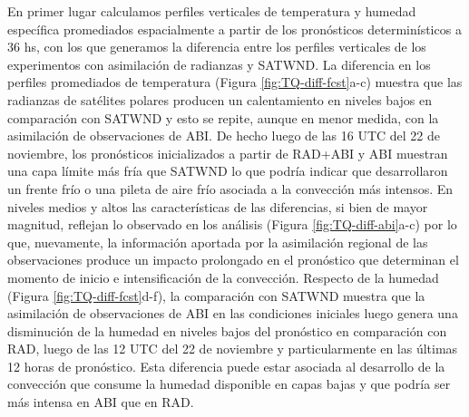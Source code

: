 \documentclass[12pt,oneside,a4paper]{reedthesis}
\begin{document}
En primer lugar calculamos perfiles verticales de temperatura y humedad específica promediados espacialmente a partir de los pronósticos determinísticos a 36 hs, con los que generamos la diferencia entre los perfiles verticales de los experimentos con asimilación de radianzas y SATWND. La diferencia en los perfiles promediados de temperatura (Figura \ref{fig:TQ-diff-fcst}a-c) muestra que las radianzas de satélites polares producen un calentamiento en niveles bajos en comparación con SATWND y esto se repite, aunque en menor medida, con la asimilación de observaciones de ABI. De hecho luego de las 16 UTC del 22 de noviembre, los pronósticos inicializados a partir de RAD+ABI y ABI muestran una capa límite más fría que SATWND lo que podría indicar que desarrollaron un frente frío o una pileta de aire frío asociada a la convección más intensos. En niveles medios y altos las características de las diferencias, si bien de mayor magnitud, reflejan lo observado en los análisis (Figura \ref{fig:TQ-diff-abi}a-c) por lo que, nuevamente, la información aportada por la asimilación regional de las observaciones produce un impacto prolongado en el pronóstico que determinan el momento de inicio e intensificación de la convección. Respecto de la humedad (Figura \ref{fig:TQ-diff-fcst}d-f), la comparación con SATWND muestra que la asimilación de observaciones de ABI en las condiciones iniciales luego genera una disminución de la humedad en niveles bajos del pronóstico en comparación con RAD, luego de las 12 UTC del 22 de noviembre y particularmente en las últimas 12 horas de pronóstico. Esta diferencia puede estar asociada al desarrollo de la convección que consume la humedad disponible en capas bajas y que podría ser más intensa en ABI que en RAD.
\end{document}

